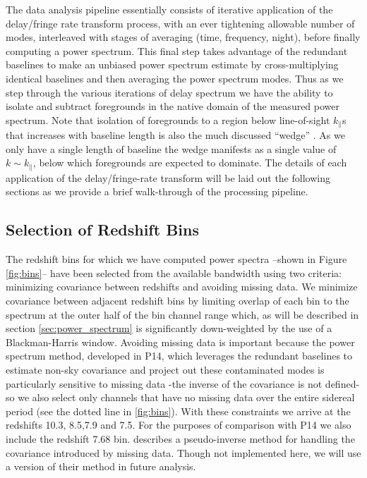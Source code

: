 \documentclass[preprint]{aastex}
\begin{document}
The data analysis pipeline essentially consists of iterative application of the delay/fringe rate transform process, with an ever tightening allowable number of modes, interleaved with stages of averaging (time, frequency, night), before finally computing a power spectrum.  This final step takes advantage of the redundant baselines to make an unbiased power spectrum estimate by cross-multiplying identical baselines and then averaging the power spectrum modes.  Thus as we step through the various iterations of delay spectrum we have the ability to isolate and subtract foregrounds in the native domain of the measured power spectrum. Note that isolation of foregrounds to a region below line-of-sight $k_\parallel$s that increases with baseline length is also the much discussed ``wedge'' \cite{Liu:2014p10462,Liu:2014p10463,Thyagarajan:2013p10039,Pober:2013p9942,Trott:2012p10466,Morales:2012p8790,Parsons:2012p8896,Vedantham:2012p10297,Datta:2010p8781,Parsons:2009p7859}. As we only have a single length of baseline the wedge manifests as a single value of $k\sim k_\parallel$, below which foregrounds are expected to dominate.  The details of each application of the delay/fringe-rate transform will be laid out the following sections as we provide a brief walk-through of the processing pipeline. 


\subsection{Selection of Redshift Bins}
The redshift bins for which we have computed power spectra --shown in Figure \ref{fig:bins}-- have been selected from the available bandwidth using two criteria: minimizing covariance between redshifts and avoiding missing data. We minimize covariance between adjacent redshift bins by limiting overlap of each bin to the spectrum at the outer half of the bin channel range which, as will be described in section \ref{sec:power_spectrum} is significantly down-weighted by the use of a Blackman-Harris window.   Avoiding missing data is important because the power spectrum method, developed in P14, which leverages the redundant baselines to estimate non-sky covariance and project out these contaminated modes is particularly sensitive to missing data -the inverse of the covariance is not defined- so we also select only channels that have no missing data over the entire sidereal period (see the dotted line in \ref{fig:bins}).  With these constraints we arrive at the redshifts 10.3, 8.5,7.9 and 7.5.  For the purposes of comparison with P14 we also include the redshift 7.68 bin.  \citet{Dillon:2013p10497}describes a pseudo-inverse method for handling the covariance introduced by missing data. Though not implemented here, we will use a version of their method in future analysis.  
\end{document}
